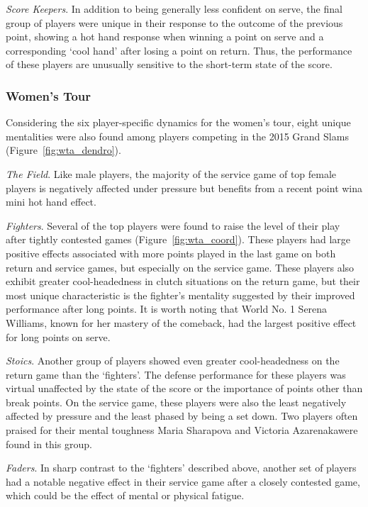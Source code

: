 \documentclass{Latex/svjour3}
\begin{document}
\textit{Score Keepers}. In addition to being generally less confident
on serve, the final group of players were unique in
their response to the outcome of the previous point, showing a hot
hand response when winning a point on serve and a corresponding `cool
hand' after losing a point on return. Thus, the performance of these
players are unusually sensitive to the short-term state of the score. 

\subsubsection{Women's Tour}

Considering the six player-specific dynamics for the women's tour, eight unique mentalities were also found among players competing
in the 2015 Grand Slams (Figure~\ref{fig:wta_dendro}). 

\textit{The Field}. Like male players, the majority of the service
game of top female
players is negatively affected under pressure but benefits from a
recent point win\textemdash a mini hot hand effect. 

\textit{Fighters}. Several of the top players were found to raise the level of
their play after tightly contested games (Figure~\ref{fig:wta_coord}). These players had large
positive effects associated with more points played in the last game
on both return and service games, but especially on the service
game. These players also exhibit greater cool-headedness in clutch
situations on the return game, but their most unique characteristic is
the fighter's mentality suggested by their improved performance after
long points. It is worth noting that World No. 1 Serena Williams,
known for her mastery of the comeback, had
the largest positive effect for long points on serve. 

\textit{Stoics}. Another group of players
showed even greater cool-headedness on the return game than the
`fighters'. The defense performance for these players was virtual
unaffected by the state of the score or the importance of points other
than break points. On the service game, these players were also the least
negatively affected by pressure and the least phased by being a set
down. Two players often praised for their mental toughness\textemdash
Maria Sharapova and Victoria Azarenaka\textemdash were found in this
group.

\textit{Faders}. In sharp contrast to the `fighters' described above,
another set of players had a notable negative effect in their service
game after a closely contested game, which could be the effect of mental or
physical fatigue. 
\end{document}
